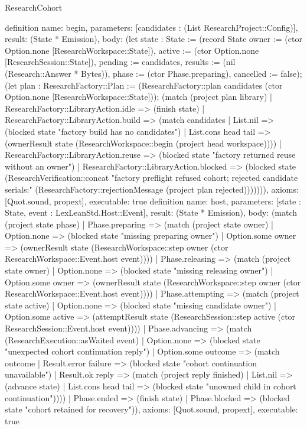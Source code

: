 \begin{lexlean}{ResearchCohort}
\begin{semanticmodule}
definition{
 name: begin,
 parameters: [candidates : (List ResearchProject::Config)],
 result: (State * Emission),
 body: (let state : State := (record State {owner := (ctor Option.none [ResearchWorkspace::State]), active := (ctor Option.none [ResearchSession::State]), pending := candidates, results := (nil (Research::Answer * Bytes)), phase := (ctor Phase.preparing), cancelled := false}); (let plan : ResearchFactory::Plan := (ResearchFactory::plan candidates (ctor Option.none [ResearchWorkspace::State])); (match (project plan library) | ResearchFactory::LibraryAction.idle => (finish state) | ResearchFactory::LibraryAction.build => (match candidates | List.nil => (blocked state "factory build has no candidates") | List.cons head tail => (ownerResult state (ResearchWorkspace::begin (project head workspace)))) | ResearchFactory::LibraryAction.reuse => (blocked state "factory returned reuse without an owner") | ResearchFactory::LibraryAction.blocked => (blocked state (ResearchVerification::concat "factory preflight refused cohort; rejected candidate serials:" (ResearchFactory::rejectionMessage (project plan rejected))))))),
 axioms: [Quot.sound, propext],
 executable: true
}
definition{
 name: host,
 parameters: [state : State, event : LexLeanStd.Host::Event],
 result: (State * Emission),
 body: (match (project state phase)
 | Phase.preparing => (match (project state owner) | Option.none => (blocked state "missing preparing owner") | Option.some owner => (ownerResult state (ResearchWorkspace::step owner (ctor ResearchWorkspace::Event.host event))))
 | Phase.releasing => (match (project state owner) | Option.none => (blocked state "missing releasing owner") | Option.some owner => (ownerResult state (ResearchWorkspace::step owner (ctor ResearchWorkspace::Event.host event))))
 | Phase.attempting => (match (project state active) | Option.none => (blocked state "missing candidate owner") | Option.some active => (attemptResult state (ResearchSession::step active (ctor ResearchSession::Event.host event))))
 | Phase.advancing => (match (ResearchExecution::asWaited event) | Option.none => (blocked state "unexpected cohort continuation reply") | Option.some outcome => (match outcome | Result.error failure => (blocked state "cohort continuation unavailable") | Result.ok reply => (match (project reply finished) | List.nil => (advance state) | List.cons head tail => (blocked state "unowned child in cohort continuation"))))
 | Phase.ended => (finish state)
 | Phase.blocked => (blocked state "cohort retained for recovery")),
 axioms: [Quot.sound, propext],
 executable: true
}
\end{semanticmodule}
\end{lexlean}
